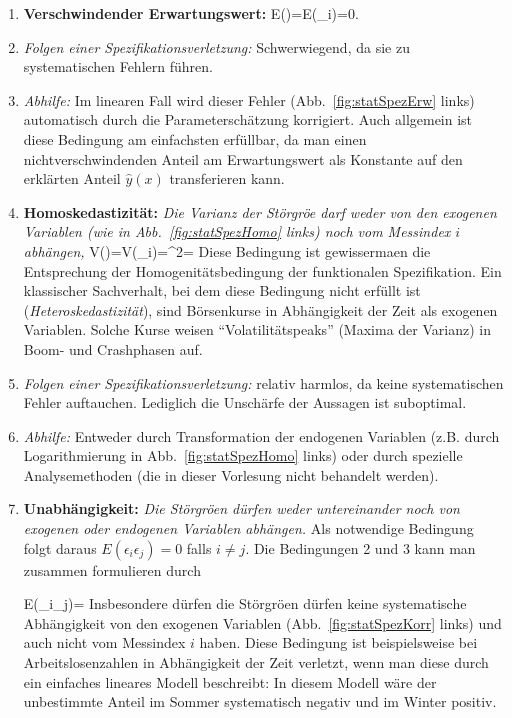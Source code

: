 \begin{enumerate}
\item \textbf{Verschwindender Erwartungswert:}
\bdm
E(\epsilon)=E(\epsilon_i)=0.
\edm

\bi
\item \textit{Folgen einer Spezifikationsverletzung:} Schwerwiegend,
  da sie zu systematischen Fehlern f\"uhren. 
\item \textit{Abhilfe:} 
 Im linearen Fall wird dieser Fehler (Abb.~\ref{fig:statSpezErw} links) 
automatisch durch die Parametersch\"atzung korrigiert. Auch allgemein
ist diese Bedingung am einfachsten erf\"ullbar, da man einen
nichtverschwindenden Anteil am Erwartungswert als Konstante  auf den erkl\"arten
Anteil $\hat{y}(x)$ transferieren kann. 
\ei

\item \textbf{Homoskedastizit\"at:}
\emph{Die Varianz der St\"orgr\"o\3e darf weder von den exogenen
Variablen (wie in Abb.~\ref{fig:statSpezHomo} links) 
noch vom Messindex $i$ abh\"angen,}
 \be
V(\epsilon)=V(\epsilon_i)=\sigeps^2=
\ee
Diese Bedingung ist
gewisserma\3en die Entsprechung der Homogenit\"atsbedingung der
funktionalen Spezifikation. Ein klassischer Sachverhalt, bei dem diese
Bedingung nicht erf\"ullt ist (\emph{Heteroskedastizit\"at}), 
sind B\"orsenkurse in Abh\"angigkeit
der Zeit als exogenen Variablen. Solche Kurse weisen 
``Volatilit\"atspeaks'' (Maxima der Varianz) in Boom- und Crashphasen
auf. 

\bi
\item \textit{Folgen einer Spezifikationsverletzung:}
relativ harmlos, da keine
systematischen Fehler auftauchen. Lediglich die Unsch\"arfe der
Aussagen ist suboptimal. 
\item \textit{Abhilfe:}
Entweder durch Transformation der endogenen Variablen (z.B. durch
Logarithmierung in Abb.~\ref{fig:statSpezHomo} links) oder durch
spezielle Analysemethoden (die in dieser Vorlesung nicht behandelt
werden).
\ei


\item \textbf{Unabh\"angigkeit:}
\emph{Die St\"orgr\"o\3en d\"urfen weder untereinander noch von
exogenen oder endogenen Variablen abh\"angen.} Als notwendige
Bedingung folgt daraus $E(\epsilon_i\epsilon_j)=0$ falls $i\neq j$. 
Die Bedingungen 2 und 3 kann man zusammen formulieren durch

\be
E(\epsilon_i\epsilon_j)=
\ee
Insbesondere d\"urfen 
die St\"orgr\"o\3en d\"urfen keine systematische Abh\"angigkeit von
den exogenen Variablen (Abb.~\ref{fig:statSpezKorr} links) und auch
nicht vom Messindex $i$ haben. Diese Bedingung ist beispielsweise 
bei Arbeitslosenzahlen in Abh\"angigkeit der Zeit verletzt, wenn man
diese durch ein einfaches lineares Modell beschreibt: In diesem Modell
w\"are der unbestimmte Anteil im Sommer systematisch negativ und im
Winter positiv.


\end{enumerate}
